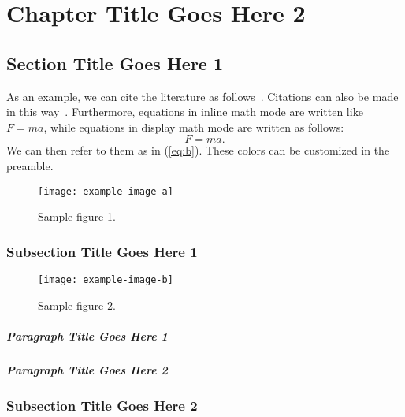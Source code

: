 \chapter{Chapter Title Goes Here 2}

\section{Section Title Goes Here 1}
As an example, we can cite the literature as follows~\cite{article-minimal,inbook-minimal}. Citations can also be made in this way~\cite{book-minimal,booklet-minimal,incollection-minimal}. Furthermore, equations in inline math mode are written like $F = ma$, while equations in display math mode are written as follows:
\begin{equation}
  \label{eq:b}
  F = ma.
\end{equation}
We can then refer to them as in (\ref{eq:b}). These colors can be customized in the preamble.

\lipsum[1-5]

\begin{figure}
  \centering
  \texttt{[image: example-image-a]}
  \caption{Sample figure 1.}
\end{figure}

\subsection{Subsection Title Goes Here 1}

\lipsum[6-9]

\begin{figure}
  \centering
  \texttt{[image: example-image-b]}
  \caption{Sample figure 2.}
\end{figure}

\paragraph{Paragraph Title Goes Here 1}

\lipsum[10]

\paragraph{Paragraph Title Goes Here 2}

\lipsum[11]

\subsection{Subsection Title Goes Here 2}


